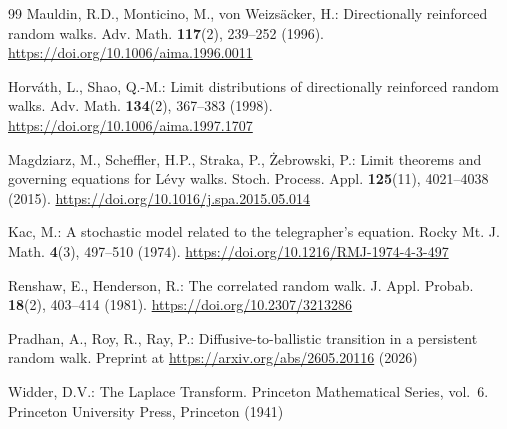 \documentclass[11pt]{article}
\theoremstyle{definition}
\theoremstyle{remark}
\begin{document}
\begin{thebibliography}{99}
Mauldin, R.D., Monticino, M., von Weizs\"acker, H.: Directionally reinforced
random walks. Adv. Math. \textbf{117}(2), 239--252 (1996).
\url{https://doi.org/10.1006/aima.1996.0011}

Horv\'ath, L., Shao, Q.-M.: Limit distributions of directionally reinforced
random walks. Adv. Math. \textbf{134}(2), 367--383 (1998).
\url{https://doi.org/10.1006/aima.1997.1707}

Magdziarz, M., Scheffler, H.P., Straka, P., \.Zebrowski, P.: Limit theorems
and governing equations for L\'evy walks. Stoch. Process. Appl.
\textbf{125}(11), 4021--4038 (2015).
\url{https://doi.org/10.1016/j.spa.2015.05.014}

Kac, M.: A stochastic model related to the telegrapher's equation. Rocky Mt.
J. Math. \textbf{4}(3), 497--510 (1974).
\url{https://doi.org/10.1216/RMJ-1974-4-3-497}

Renshaw, E., Henderson, R.: The correlated random walk. J. Appl. Probab.
\textbf{18}(2), 403--414 (1981). \url{https://doi.org/10.2307/3213286}

Pradhan, A., Roy, R., Ray, P.: Diffusive-to-ballistic transition in a
persistent random walk. Preprint at \url{https://arxiv.org/abs/2605.20116}
(2026)

Widder, D.V.: The Laplace Transform. Princeton Mathematical Series, vol.~6.
Princeton University Press, Princeton (1941)

\end{thebibliography}
\end{document}
